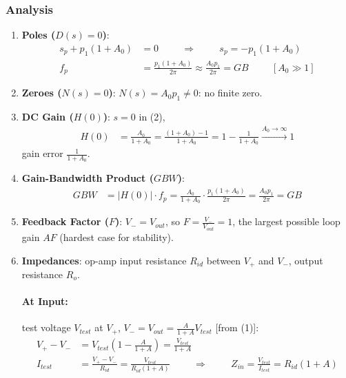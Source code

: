 \subsubsection{Analysis}
\begin{enumerate}
  \item \textbf{Poles (\(D(s) = 0\))}:
    \begin{align*}
      s_p + p_1(1 + A_0) &= 0 \hspace{1cm} \Rightarrow \hspace{1cm} s_p = -p_1(1 + A_0) \\
      f_p &= \frac{p_1(1 + A_0)}{2\pi} \approx \frac{A_0 p_1}{2\pi} = GB \hspace{1cm} [A_0 \gg 1]
    \end{align*}
  \item \textbf{Zeroes (\(N(s) = 0\))}: \(N(s) = A_0 p_1 \neq 0\): no finite zero.
  \item \textbf{DC Gain (\(H(0)\))}: \(s = 0\) in (2),
    \begin{align*}
      H(0) &= \frac{A_0}{1 + A_0} = \frac{(1 + A_0) - 1}{1 + A_0} = 1 - \frac{1}{1 + A_0} \xrightarrow{A_0 \to \infty} 1
    \end{align*}
    gain error \(\frac{1}{1 + A_0}\).
  \item \textbf{Gain-Bandwidth Product (\(GBW\))}:
    \begin{align*}
      GBW &= |H(0)| \cdot f_p = \frac{A_0}{1 + A_0}\cdot\frac{p_1(1 + A_0)}{2\pi} = \frac{A_0 p_1}{2\pi} = GB
    \end{align*}
  \item \textbf{Feedback Factor (\(F\))}: \(V_- = V_{out}\), so \(F = \frac{V_-}{V_{out}} = 1\),
    the largest possible loop gain \(A F\) (hardest case for stability).
  \item \textbf{Impedances}: op-amp input resistance \(R_{id}\) between \(V_+\) and \(V_-\),
    output resistance \(R_o\).
    \paragraph{At Input:} test voltage \(V_{test}\) at \(V_+\), \(V_- = V_{out} = \frac{A}{1 + A} V_{test}\) [from (1)]:
    \begin{align*}
      V_+ - V_- &= V_{test}\left(1 - \frac{A}{1 + A}\right) = \frac{V_{test}}{1 + A} \\
      I_{test} &= \frac{V_+ - V_-}{R_{id}} = \frac{V_{test}}{R_{id}(1 + A)} \hspace{1cm} \Rightarrow \hspace{1cm} Z_{in} = \frac{V_{test}}{I_{test}} = R_{id}(1 + A)
    \end{align*}

\end{enumerate}

